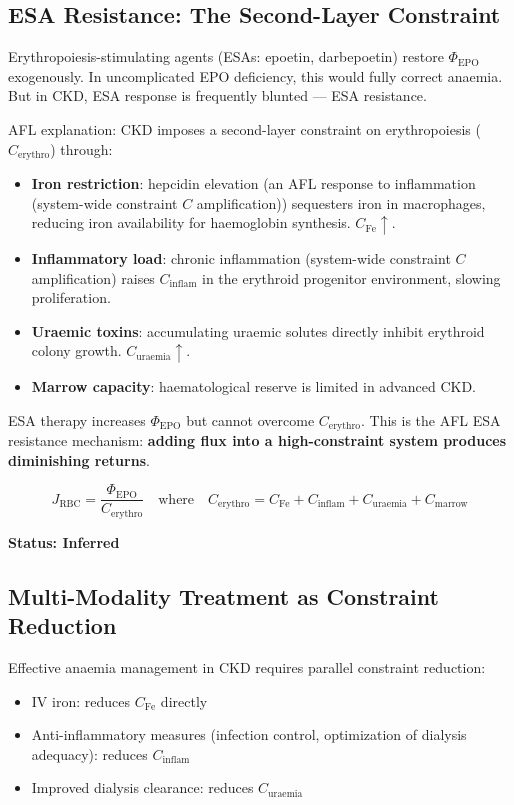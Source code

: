 \documentclass[12pt,a4paper]{article}
\begin{document}
\subsection{ESA Resistance: The Second-Layer Constraint}

Erythropoiesis-stimulating agents (ESAs: epoetin, darbepoetin) restore $\Phi_{\mathrm{EPO}}$ exogenously. In uncomplicated EPO deficiency, this would fully correct anaemia. But in CKD, ESA response is frequently blunted --- ESA resistance.

AFL explanation: CKD imposes a second-layer constraint on erythropoiesis ($C_{\mathrm{erythro}}$) through:
\begin{itemize}
    \item \textbf{Iron restriction}: hepcidin elevation (an AFL response to inflammation (system-wide constraint $C$ amplification)) sequesters iron in macrophages, reducing iron availability for haemoglobin synthesis. $C_{\mathrm{Fe}} \uparrow$.
    \item \textbf{Inflammatory load}: chronic inflammation (system-wide constraint $C$ amplification) raises $C_{\mathrm{inflam}}$ in the erythroid progenitor environment, slowing proliferation.
    \item \textbf{Uraemic toxins}: accumulating uraemic solutes directly inhibit erythroid colony growth. $C_{\mathrm{uraemia}} \uparrow$.
    \item \textbf{Marrow capacity}: haematological reserve is limited in advanced CKD.
\end{itemize}

ESA therapy increases $\Phi_{\mathrm{EPO}}$ but cannot overcome $C_{\mathrm{erythro}}$. This is the AFL ESA resistance mechanism: \textbf{adding flux into a high-constraint system produces diminishing returns}.

\begin{equation}
    J_{\mathrm{RBC}} = \frac{\Phi_{\mathrm{EPO}}}{C_{\mathrm{erythro}}} \quad \text{where} \quad C_{\mathrm{erythro}} = C_{\mathrm{Fe}} + C_{\mathrm{inflam}} + C_{\mathrm{uraemia}} + C_{\mathrm{marrow}}
\end{equation}

\textbf{Status: Inferred}

\subsection{Multi-Modality Treatment as Constraint Reduction}

Effective anaemia management in CKD requires parallel constraint reduction:
\begin{itemize}
    \item IV iron: reduces $C_{\mathrm{Fe}}$ directly
    \item Anti-inflammatory measures (infection control, optimization of dialysis adequacy): reduces $C_{\mathrm{inflam}}$
    \item Improved dialysis clearance: reduces $C_{\mathrm{uraemia}}$
\end{itemize}
\end{document}
